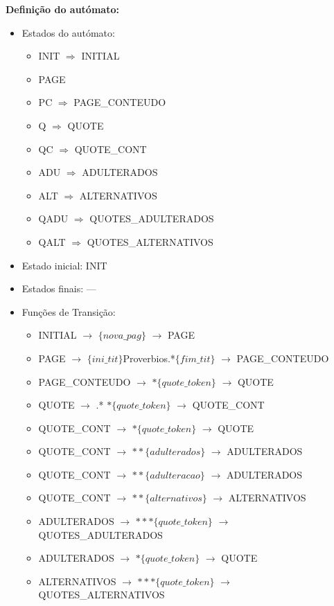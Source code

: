 \documentclass[11pt,a4paper]{report}
\begin{document}
	\vspace{1.0cm}

\textbf{Definição do autómato:}

\begin{itemize}
	\item Estados do autómato:
		\begin{itemize}
			\item INIT $\Rightarrow$ INITIAL
			\item PAGE
			\item PC $\Rightarrow$ PAGE\_CONTEUDO
			\item Q $\Rightarrow$ QUOTE
			\item QC $\Rightarrow$ QUOTE\_CONT
			\item ADU $\Rightarrow$ ADULTERADOS
			\item ALT $\Rightarrow$ ALTERNATIVOS
			\item QADU $\Rightarrow$ QUOTES\_ADULTERADOS
			\item QALT $\Rightarrow$ QUOTES\_ALTERNATIVOS
		\end{itemize}
	\item Estado inicial: INIT
	\item Estados finais: ---
	\item Funções de Transição:
		\begin{itemize}
			\item INITIAL $\rightarrow$ $\{nova\_pag\}$ $\rightarrow$ PAGE
			\item PAGE $\rightarrow$ $\{ini\_tit\}$Proverbios.*$\{fim\_tit\}$ $\rightarrow$ PAGE\_CONTEUDO
			\item PAGE\_CONTEUDO $\rightarrow$ $*\{quote\_token\}$ $\rightarrow$ QUOTE
			\item QUOTE $\rightarrow$ .* $*\{quote\_token\}$ $\rightarrow$	QUOTE\_CONT
			\item QUOTE\_CONT $\rightarrow$ $*\{quote\_token\}$ $\rightarrow$ QUOTE
			\item QUOTE\_CONT $\rightarrow$ $**\{adulterados\}$ $\rightarrow$ ADULTERADOS
			\item QUOTE\_CONT $\rightarrow$ $**\{adulteracao\}$ $\rightarrow$ ADULTERADOS
			\item QUOTE\_CONT $\rightarrow$ $**\{alternativos\}$ $\rightarrow$ ALTERNATIVOS
			\item ADULTERADOS $\rightarrow$ $***\{quote\_token\}$ $\rightarrow$ QUOTES\_ADULTERADOS
			\item ADULTERADOS $\rightarrow$ $*\{quote\_token\}$ $\rightarrow$ QUOTE
			\item ALTERNATIVOS $\rightarrow$ $***\{quote\_token\}$ $\rightarrow$ QUOTES\_ALTERNATIVOS

\end{itemize}
\end{itemize}
\end{document}
